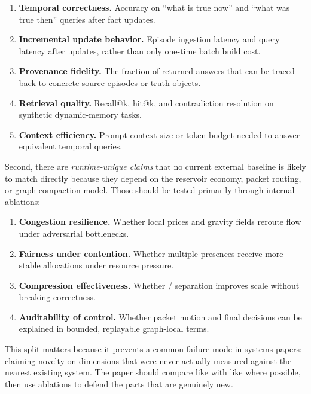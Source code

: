 \begin{enumerate}[leftmargin=1.5em]
  \item \textbf{Temporal correctness.} Accuracy on ``what is true now'' and ``what was true then'' queries after fact updates.
  \item \textbf{Incremental update behavior.} Episode ingestion latency and query latency after updates, rather than only one-time batch build cost.
  \item \textbf{Provenance fidelity.} The fraction of returned answers that can be traced back to concrete source episodes or truth objects.
  \item \textbf{Retrieval quality.} Recall@k, hit@k, and contradiction resolution on synthetic dynamic-memory tasks.
  \item \textbf{Context efficiency.} Prompt-context size or token budget needed to answer equivalent temporal queries.
\end{enumerate}

Second, there are \emph{runtime-unique claims} that no current external baseline is likely to match directly because they depend on the reservoir economy, packet routing, or graph compaction model. Those should be tested primarily through internal ablations:

\begin{enumerate}[leftmargin=1.5em]
  \item \textbf{Congestion resilience.} Whether local prices and gravity fields reroute flow under adversarial bottlenecks.
  \item \textbf{Fairness under contention.} Whether multiple presences receive more stable allocations under resource pressure.
  \item \textbf{Compression effectiveness.} Whether \truthgraph{}/\viewgraph{} separation improves scale without breaking correctness.
  \item \textbf{Auditability of control.} Whether packet motion and final decisions can be explained in bounded, replayable graph-local terms.
\end{enumerate}

This split matters because it prevents a common failure mode in systems papers: claiming novelty on dimensions that were never actually measured against the nearest existing system. The paper should compare like with like where possible, then use ablations to defend the parts that are genuinely new.
